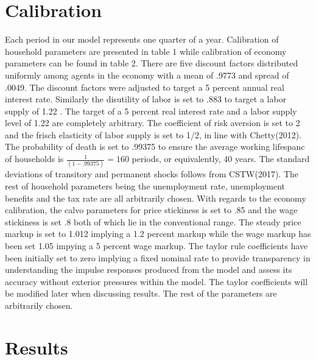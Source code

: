 \documentclass[titlepage]{\econtex}\providecommand{\texname}{BufferStockTheory}
\providecommand{\TableDir}{Tables}
\begin{document}
\hypertarget{Calibration}{}
\section{Calibration}



Each period in our model represents one quarter of a year. Calibration of household parameters are presented in table 1 while calibration of economy parameters can be found in table 2. There are five discount factors distributed uniformly among agents in the economy with a mean of .9773 and spread of .0049. The discount factors were adjusted to target a 5 percent annual real interest rate. Similarly the disutility of labor is set to .883 to target a labor supply of 1.22 . The target of a 5 percent real interest rate and a labor supply level of 1.22 are completely arbitrary.  The coefficient of risk aversion is set to 2 and the frisch elasticity of labor supply is set to 1/2, in line with Chetty(2012).  The probability of death is set to .99375 to ensure the average working lifespanc of households is $ \frac{1}{(1-.99375)} = 160$ periods, or equivalently, 40 years.  The standard deviations of transitory and permanent shocks follows from CSTW(2017). The rest of household parameters being the unemployment rate, unemployment benefits and the tax rate are all arbitrarily chosen. With regards to the economy calibration, the calvo parameters for price stickiness is set to .85 and the wage stickiness is set .8 both of which lie in the conventional range. The steady price markup is set to 1.012 implying a 1.2 percent markup while the wage markup has been set 1.05 impying a 5 percent wage markup. The taylor rule coefficients have been initially set to zero implying a fixed nominal rate to provide transparency in understanding the impulse responses produced from the model and assess its accuracy without exterior pressures within the model. The taylor coefficients will be modified later when discussing results. The rest of the parameters are arbitrarily chosen. 






\hypertarget{Results}{}
\section{Results}
\end{document}
